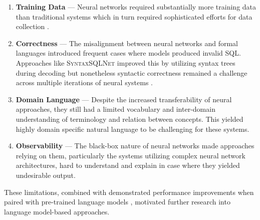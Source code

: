 \begin{enumerate}
    \item \textbf{Training Data} — Neural networks required substantially more
        training data than traditional systems which in turn required
        sophisticated efforts for data collection \citep{Spider}.
    \item \textbf{Correctness} — The misalignment between neural networks
        and formal languages introduced frequent cases where models produced
        invalid SQL. Approaches like \textsc{SyntaxSQLNet} improved this by
        utilizing syntax trees during decoding but nonetheless syntactic
        correctness remained a challenge across multiple iterations of neural
        systems \citep{SyntaxSQLNet}.
    \item \textbf{Domain Language} — Despite the increased transferability
        of neural approaches, they still had a limited vocabulary and
        inter-domain understanding of terminology and relation
        between concepts. This yielded highly domain specific natural language
        to be challenging for these systems.
    \item \textbf{Observability} — The black-box nature of neural networks made
        approaches relying on them, particularly the systems utilizing complex
        neural network architectures, hard to understand and explain in case
        where they yielded undesirable output. 
\end{enumerate}

These limitations, combined with demonstrated performance improvements when
paired with pre-trained language models \citep{RATSQL}, motivated further
research into language model-based approaches.
